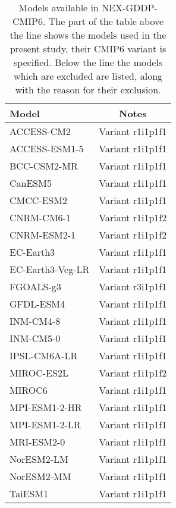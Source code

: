 \begin{table}
  \centering
  \caption{Models available in NEX-GDDP-CMIP6. The part of the table above the line shows the models used in the present study, their \gls{CMIP6} variant is specified. Below the line the models which are excluded are listed, along with the reason for their exclusion.}
  \label{tab:CMIP6_models}
  \begin{tabular}{lc}
    Model            & Notes                          \\
    \hline
    ACCESS-CM2       & Variant r1i1p1f1               \\
    ACCESS-ESM1-5    & Variant r1i1p1f1               \\
    BCC-CSM2-MR      & Variant r1i1p1f1               \\
    CanESM5          & Variant r1i1p1f1               \\
    CMCC-ESM2        & Variant r1i1p1f1               \\
    CNRM-CM6-1       & Variant r1i1p1f2               \\
    CNRM-ESM2-1      & Variant r1i1p1f2               \\
    EC-Earth3        & Variant r1i1p1f1               \\
    EC-Earth3-Veg-LR & Variant r1i1p1f1               \\
    FGOALS-g3        & Variant r3i1p1f1               \\
    GFDL-ESM4        & Variant r1i1p1f1               \\
    INM-CM4-8        & Variant r1i1p1f1               \\
    INM-CM5-0        & Variant r1i1p1f1               \\
    IPSL-CM6A-LR     & Variant r1i1p1f1               \\
    MIROC-ES2L       & Variant r1i1p1f2               \\
    MIROC6           & Variant r1i1p1f1               \\
    MPI-ESM1-2-HR    & Variant r1i1p1f1               \\
    MPI-ESM1-2-LR    & Variant r1i1p1f1               \\
    MRI-ESM2-0       & Variant r1i1p1f1               \\
    NorESM2-LM       & Variant r1i1p1f1               \\
    NorESM2-MM       & Variant r1i1p1f1               \\
    TaiESM1          & Variant r1i1p1f1               \\

\end{tabular}
\end{table}
